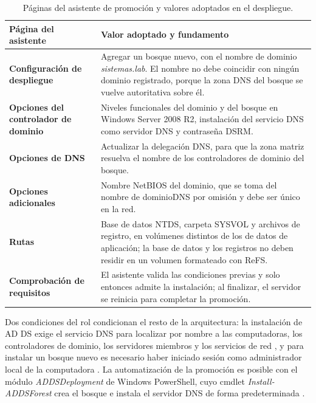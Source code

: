 \documentclass[12pt]{article}
\begin{document}
\begin{table}[H]
\centering
\small
\renewcommand{\arraystretch}{1.15}
\renewcommand{\tabularxcolumn}[1]{m{#1}}
\setlength{\emergencystretch}{1.5em}
\caption{Páginas del asistente de promoción y valores adoptados en el despliegue.}
\label{tab:asistentePromocion}
\begin{tabularx}{\textwidth}{>{\centering\arraybackslash}m{4.4cm} X}
\toprule
\textbf{Página del asistente} & \textbf{Valor adoptado y fundamento} \\
\midrule
\textbf{Configuración de despliegue} & Agregar un bosque nuevo, con el nombre de dominio \textit{sistemas.lab}. El nombre no debe coincidir con ningún dominio registrado, porque la zona DNS del bosque se vuelve autoritativa sobre él. \\
\addlinespace
\textbf{Opciones del controlador de dominio} & Niveles funcionales del dominio y del bosque en Windows Server 2008 R2, instalación del servicio DNS como servidor DNS y contraseña DSRM. \\
\addlinespace
\textbf{Opciones de DNS} & Actualizar la delegación DNS, para que la zona matriz resuelva el nombre de los controladores de dominio del bosque. \\
\addlinespace
\textbf{Opciones adicionales} & Nombre NetBIOS del dominio, que se toma del nombre de dominioDNS por omisión y debe ser único en la red. \\
\addlinespace
\textbf{Rutas} & Base de datos NTDS, carpeta SYSVOL y archivos de registro, en volúmenes distintos de los de datos de aplicación; la base de datos y los registros no deben residir en un volumen formateado con ReFS. \\
\addlinespace
\textbf{Comprobación de requisitos} & El asistente valida las condiciones previas y solo entonces admite la instalación; al finalizar, el servidor se reinicia para completar la promoción. \\
\bottomrule
\end{tabularx}
\end{table}

Dos condiciones del rol condicionan el resto de la arquitectura: la instalación de AD DS exige el servicio DNS para localizar por nombre a las computadoras, los controladores de dominio, los servidores miembros y los servicios de red \parencite{microsoftADDSOverview}, y para instalar un bosque nuevo es necesario haber iniciado sesión como administrador local de la computadora \parencite{microsoftInstallADDS}. La automatización de la promoción es posible con el módulo \textit{ADDSDeployment} de Windows PowerShell, cuyo cmdlet \textit{Install-ADDSForest} crea el bosque e instala el servidor DNS de forma predeterminada \parencite{microsoftInstallADDS}.
\end{document}

